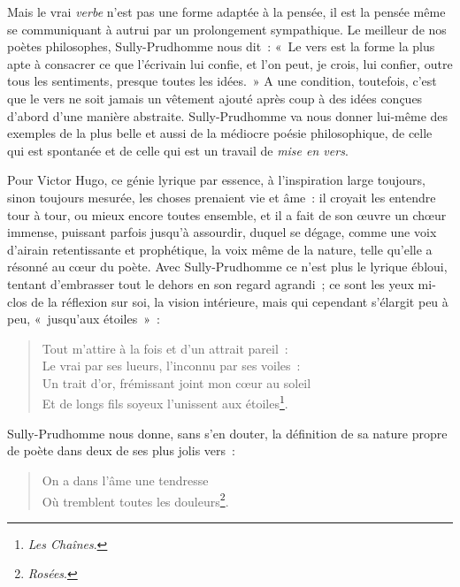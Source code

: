 \documentclass[french,twoside]{book} %
\begin{document}
\noindent Mais le vrai \emph{verbe} n’est pas une forme adaptée à la pensée, il est la pensée même se communiquant à autrui par un prolongement sympathique. Le meilleur de nos poètes philosophes, Sully-Prudhomme nous dit : « Le vers est la forme la plus apte à consacrer ce que l’écrivain lui confie, et l’on peut, je crois, lui confier, outre tous les sentiments, presque toutes les idées. » A une condition, toutefois, c’est que le vers ne soit jamais un vêtement ajouté après coup à des idées conçues d’abord d’une manière abstraite. Sully-Prudhomme va nous donner lui-même des exemples de la plus belle et aussi de la médiocre poésie philosophique, de celle qui est spontanée et de celle qui est un travail de \emph{mise en vers}.\par
Pour Victor Hugo, ce génie lyrique par essence, à l’inspiration large toujours, sinon toujours mesurée, les choses prenaient vie et âme : il croyait les entendre tour à tour, ou mieux encore toutes ensemble, et il a fait de son œuvre un chœur immense, puissant parfois jusqu’à assourdir, duquel se dégage, comme une voix d’airain retentissante et prophétique, la voix même de la nature, telle qu’elle a résonné au cœur du poète. Avec Sully-Prudhomme ce n’est plus le lyrique ébloui, tentant d’embrasser tout le dehors en son regard agrandi ; ce sont les yeux mi-clos de la réflexion sur soi, la vision intérieure, mais qui cependant s’élargit peu à peu, « jusqu’aux étoiles » :\par


\begin{verse}
Tout m’attire à la fois et d’un attrait pareil :\\
Le vrai par ses lueurs, l’inconnu par ses voiles :\\
Un trait d’or, frémissant joint mon cœur au soleil\\
Et de longs fils soyeux l’unissent aux étoiles\footnote{\emph{Les Chaînes}.}.\\
\end{verse}

\noindent Sully-Prudhomme nous donne, sans s’en douter, la définition de sa nature propre de poète dans deux de ses plus jolis vers :\par


\begin{verse}
On a dans l’âme une tendresse\\
Où tremblent toutes les douleurs\footnote{\emph{Rosées}.}.\\
\end{verse}
\end{document}
